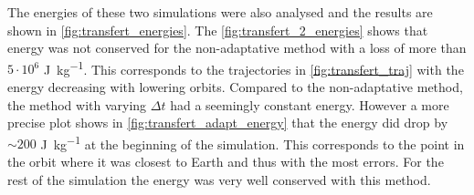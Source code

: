 The energies of these two simulations were also analysed and the results are shown in \autoref{fig:transfert_energies}. The \autoref{fig:transfert_2_energies} shows that energy was not conserved for the non-adaptative method with a loss of more than $5\cdot10^6$ \si{\joule\per\kilo\gram}. This corresponds to the trajectories in \autoref{fig:transfert_traj} with the energy decreasing with lowering orbits. Compared to the non-adaptative method, the method with varying $\Delta t$ had a seemingly constant energy. However a more precise plot shows in \autoref{fig:transfert_adapt_energy} that the energy did drop by $\sim 200$ \si{\joule\per\kilo\gram} at the beginning of the simulation. This corresponds to the point in the orbit where it was closest to Earth and thus with the most errors. For the rest of the simulation the energy was very well conserved with this method.
